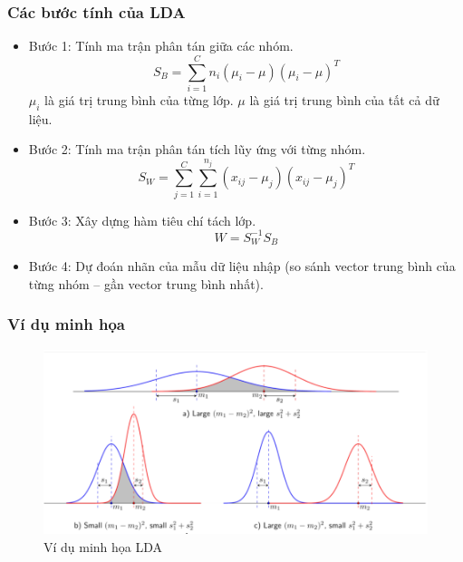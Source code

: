 \documentclass[a4paper, 12pt]{article}
\begin{document}
\subsubsection{Các bước tính của LDA}

\begin{itemize}
    \item Bước 1: Tính ma trận phân tán giữa các nhóm.
    \begin{equation}
        S_B=\sum_{i=1}^{C}{n_i(\mu_i - \mu)(\mu_i-\mu)^T}
    \end{equation}
    \subitem $\mu_i$ là giá trị trung bình của từng lớp. 
    \subitem $\mu$ là giá trị trung bình của tất cả dữ liệu. 

    \item Bước 2: Tính ma trận phân tán tích lũy ứng với từng nhóm.
    \begin{equation}
        S_W=\sum_{j=1}^{C}{\sum_{i=1}^{n_j}{(x_{ij}-\mu_j)(x_{ij}-\mu_j)^T}}
    \end{equation}

    \item Bước 3: Xây dựng hàm tiêu chí tách lớp.
    \begin{equation}
        W = S_W^{-1}S_B
    \end{equation}

    \item Bước 4: Dự đoán nhãn của mẫu dữ liệu nhập (so sánh vector trung bình của từng nhóm – gần vector trung bình nhất).
\end{itemize}

\subsubsection{Ví dụ minh họa}

\begin{figure}[H]
    \begin{center}
        \includegraphics[scale=0.3]{img/LDA-example-1}
        \caption{Ví dụ minh họa LDA}
    \end{center}
\end{figure}
\end{document}
